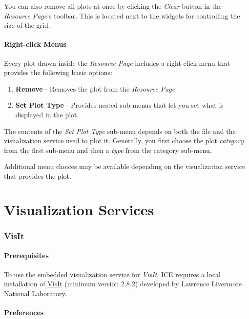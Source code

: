 You can also remove all plots at once by clicking the \emph{Clear}
button in the \emph{Resource Page}'s toolbar. This is located next to
the widgets for controlling the size of the grid.

\paragraph{Right-click Menus}\label{right-click-menus}

Every plot drawn inside the \emph{Resource Page} includes a right-click
menu that provides the following basic options:

\begin{enumerate}
\itemsep1pt\parskip0pt
\item
  \textbf{Remove} - Removes the plot from the \emph{Resource Page}
\item
  \textbf{Set Plot Type} - Provides nested sub-menus that let you set
  what is displayed in the plot.
\end{enumerate}

The contents of the \emph{Set Plot Type} sub-menu depends on both the
file and the visualization service used to plot it. Generally, you first
choose the plot \emph{category} from the first sub-menu and then a
\emph{type} from the category sub-menu.

Additional menu choices may be available depending on the visualization
service that provides the plot.

\section{Visualization Services}\label{visualization-services}

\subsubsection{VisIt}\label{visit}

\paragraph{Prerequisites}\label{prerequisites}

To use the embedded visualization service for \emph{VisIt}, ICE requires
a local installation of
\href{https://wci.llnl.gov/simulation/computer-codes/visit/}{VisIt}
(minimum version 2.8.2) developed by Lawrence Livermore National
Laboratory.

\paragraph{Preferences}\label{preferences}

